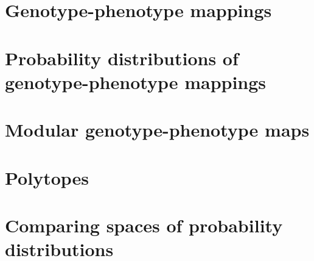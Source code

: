 

%

\newtoggle{thmsty}
\togglefalse{thmsty}

\newtoggle{longpres}
\togglefalse{longpres}









	\begin{frame}
		\titlepage
	\end{frame}
	
	\section[GP maps]{Genotype-phenotype mappings}
	
		
	\section[PDs of GPs]{Probability distributions of genotype-phenotype mappings}
    

	\section[Modular GPs]{Modular genotype-phenotype maps}
	
	
%	

	\section{Polytopes}
		

	\section[PD comp]{Comparing spaces of probability distributions}
%	
	

%	
	
	
